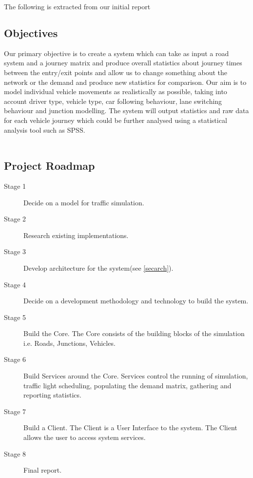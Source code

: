 The following is extracted from our initial report \cite{init}
\subsection{Objectives}
	Our primary objective is to create a system which can take as input a road system
	and a journey matrix and produce overall statistics about journey times between the entry/exit points
	and allow us to change something about the network or the demand and produce new statistics for
	comparison. Our aim is to model individual vehicle movements as realistically as possible, taking 
	into account driver type, vehicle type, car following behaviour, lane switching behaviour and junction
	modelling. The system will output statistics and raw data for each vehicle journey which could be
	further analysed using a statistical analysis tool such as SPSS.
\\ \\
	\subsection{Project Roadmap}
	
	\begin{description}
		\item[Stage 1] Decide on a model for traffic simulation.
		\item[Stage 2] Research existing implementations.
		\item[Stage 3] Develop architecture for the system(see \ref{secarch}).
		\item[Stage 4] Decide on a development methodology and technology to build the system.
		\item[Stage 5] Build the Core. The Core consists of the building blocks of the simulation i.e. Roads, Junctions, Vehicles.
		\item[Stage 6] Build Services around the Core. Services control the running of simulation, traffic light scheduling, populating the demand matrix, gathering and reporting statistics.  
		\item[Stage 7] Build a Client. The Client is a User Interface to the system. The Client allows the user to access system services.
		\item[Stage 8] Final report.
		\\
	\end{description}
	
